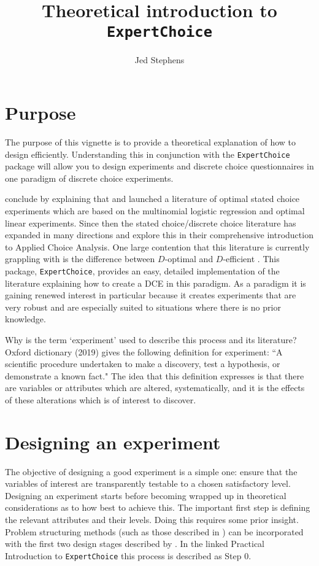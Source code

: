 \documentclass{article}
\title{Theoretical introduction to \texttt{ExpertChoice}}
\author{Jed Stephens}
\begin{document}
\maketitle
\section{Purpose}
The purpose of this vignette is to provide a theoretical explanation of how to design efficiently.
Understanding this in conjunction with the \texttt{ExpertChoice} package will allow you to design experiments and discrete choice questionnaires in one paradigm of discrete choice experiments.

\citet[287]{hensherrosegreene2015} conclude by explaining that \citet{burgess2005optimal} and \citet{street2007construction} launched a literature of optimal stated choice experiments which are based on the multinomial logistic regression and optimal linear experiments.
Since then the stated choice/discrete choice literature has expanded in many directions and \citet{hensherrosegreene2015} explore this in their comprehensive introduction to Applied Choice Analysis.
One large contention that this literature is currently grappling with is the difference between $D$-optimal and $D$-efficient \citep{rose2009efficient-stated-choice, walker2018d}.
This package, \texttt{ExpertChoice}, provides an easy, detailed implementation of the \citet{burgess2005optimal} literature explaining how to create a DCE in this paradigm.
As a paradigm it is gaining renewed interest in particular because it creates experiments that are very robust and are especially suited to situations where there is no prior knowledge.

Why is the term `experiment' used to describe this process and its literature?
Oxford dictionary (2019) gives the following definition for experiment: ``A scientific procedure undertaken to make a discovery, test a hypothesis, or demonstrate a known fact."
The idea that this definition expresses is that there are variables or attributes which are altered, systematically, and it is the effects of these alterations which is of interest to discover.

\section{Designing an experiment}

The objective of designing a good experiment is a simple one: ensure that the variables of interest are transparently testable to a chosen satisfactory level.
Designing an experiment starts before becoming wrapped up in theoretical considerations as to how best to achieve this.
The important first step is defining the relevant attributes and their levels.
Doing this requires some prior insight.
Problem structuring methods (such as those described in \citet{belton2002multiple}) can be incorporated with the first two design stages described by \citet[194-201]{hensherrosegreene2015}.
In the linked Practical Introduction to \texttt{ExpertChoice} this process is described as Step 0.
\end{document}
